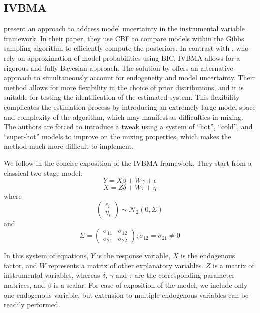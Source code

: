 \begin{refsection}
\subsection*{\ac{IVBMA}}
\textcite{KarlLenkoski2012} present an approach to address model uncertainty in the instrumental variable framework. In their paper, they use \ac{CBF} to compare models within the Gibbs sampling algorithm to efficiently compute the posteriors. In contrast with \textcite{lenkoski2014two}, who rely on approximation of model probabilities using \ac{BIC}, \ac{IVBMA} allows for a rigorous and fully Bayesian approach. The solution by \textcite{koop2012bayesian} offers an alternative approach to simultaneously account for endogeneity and model uncertainty. Their method allows for more flexibility in the choice of prior distributions, and it is suitable for testing the identification of the estimated system. This flexibility complicates the estimation process by introducing an extremely large model space and complexity of the algorithm, which may manifest as difficulties in mixing. The authors are forced to introduce a tweak using a system of ``hot'', ``cold'', and ``super-hot'' models to improve on the mixing properties, which makes the method much more difficult to implement.

We follow \textcite{KarlLenkoski2012} in the concise exposition of the \ac{IVBMA} framework. They start from a classical two-stage model:
\begin{equation}\label{ch3eq:ivbma1}
{Y} = {X} \beta + {W} \gamma + {\epsilon}
\end{equation}
%
\begin{equation}\label{ch3eq:ivbma2}
{X} = {Z} {\delta} + {W} {\tau} + {\eta}
\end{equation}
%
where
%
\begin{equation}
\begin{pmatrix}
\epsilon_{i} \\
\eta_{i}
\end{pmatrix}
\sim \mathcal{N}_{2}(0, {\Sigma})
\end{equation}
%
and
%
\begin{equation}
{\Sigma} = 
\begin{pmatrix}
 \sigma_{11} & \sigma_{12} \\
 \sigma_{21} & \sigma_{22}
\end{pmatrix}
; \sigma_{12} = \sigma_{21} \neq 0
\end{equation}

In this system of equations, ${Y}$ is the response variable, ${X}$ is the endogenous factor, and ${W}$ represents a matrix of other explanatory variables. ${Z}$ is a matrix of instrumental variables, whereas ${\delta}$, ${\gamma}$ and ${\tau}$ are the corresponding parameter matrices, and $\beta$ is a scalar. For ease of exposition of the model, we include only one endogenous variable, but extension to multiple endogenous variables can be readily performed.


\end{refsection}

